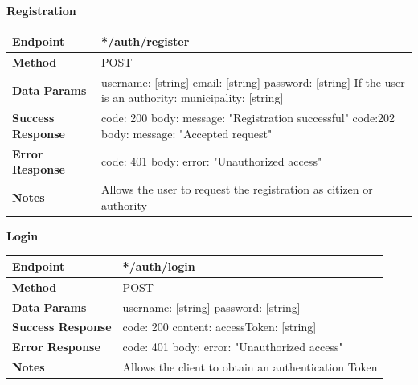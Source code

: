 \documentclass{report}
\begin{document}
\begin{center}{\textbf{Registration}}\end{center}
\begin{tabular}{| l | p{8cm} |}
    \hline
    \textbf{Endpoint} & */auth/register \\
    \hline
    \textbf{Method} & POST \\
    \hline
    \textbf{Data Params} & username: [string] \newline email: [string] \newline password: [string] \newline If the user is an authority: \newline municipality: [string]\\
    \hline
    \textbf{Success Response} & code: 200 \newline body: {message: "Registration successful"} \newline \newline code:202 \newline body: {message: "Accepted request"}\\
    \hline
    \textbf{Error Response} & code: 401 \newline body: {error: "Unauthorized access"} \\
    \hline
    \textbf{Notes} & Allows the user to request the registration as citizen or authority \\
    \hline
\end{tabular}

\begin{center}{\textbf{Login}}\end{center}
\begin{tabular}{| l | p{8cm} |}
	\hline
	\textbf{Endpoint} & */auth/login \\
	\hline
	\textbf{Method} & POST \\
	\hline
	\textbf{Data Params} & username: [string] \newline password: [string]\\
	\hline
	\textbf{Success Response} & code: 200 \newline content: {accessToken: [string]}\\
	\hline
    \textbf{Error Response} & code: 401 \newline body: {error: "Unauthorized access"} \\
	\hline
	\textbf{Notes} & Allows the client to obtain an authentication Token \\
	\hline
\end{tabular}
\end{document}
